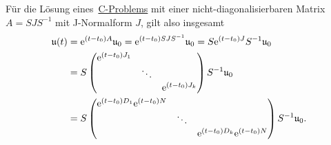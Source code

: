 \begin{remark*}
    Für die Lösung eines~\hyperref[eq:cp]{C-Problems} mit einer nicht-diagonalisierbaren Matrix $A = S J S^{-1}$
    mit J-Normalform $J$, gilt also insgesamt
    \begin{align*}
        \mathfrak{u}(t) &= \mathrm{e}^{(t - t_0) A} \mathfrak{u}_0 = \mathrm{e}^{(t - t_0) S J S^{-1}} \mathfrak{u}_0 = S \mathrm{e}^{(t - t_0) J} S^{-1} \mathfrak{u}_0\\
        &= S \begin{pmatrix}
                \mathrm{e}^{(t - t_0) J_1} &        & \\
                                   & \ddots & \\
                                   &        & \mathrm{e}^{(t - t_0) J_k}
            \end{pmatrix} S^{-1} \mathfrak{u}_0\\
        &= S \begin{pmatrix}
                \mathrm{e}^{(t - t_0) D_1} \mathrm{e}^{(t - t_0) N} &        & \\
                                                    & \ddots & \\
                                                    &        & \mathrm{e}^{(t - t_0) D_k} \mathrm{e}^{(t - t_0) N}
            \end{pmatrix} S^{-1} \mathfrak{u}_0.
    \end{align*}
\end{remark*}

